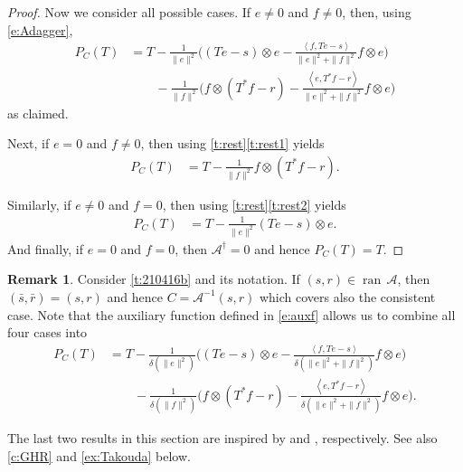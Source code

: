 \documentclass[12pt]{article}
\newcommand{\scal}[2]{\left\langle{#1},{#2}  \right\rangle}
\newcommand{\ran}{\ensuremath{{\operatorname{ran}}\,}}
\theoremstyle{definition}
\newtheorem{remark}[theorem]{Remark}
\providecommand{\ran}{\operatorname{ran}}
\providecommand{\ran}{\operatorname{ran}}
\providecommand{\mA}{\mathcal{A}}
\begin{document}
{\begin{proof}
Now we consider 
{ 
all possible
}
cases.
If $e\neq 0$ and $f\neq 0$, then,
using \cref{e:Adagger}, 
\begin{align*}
P_C(T)
&= T-
\frac{1}{\|e\|^2}\Big( (Te-s) \otimes e - 
\frac{\scal{f}{{Te-s}}}{\|e\|^2+\|f\|^2} f\otimes e\Big) \\
&\qquad - 
\frac{1}{\|f\|^2}\Big( f \otimes (T^*f-r)
-  \frac{\scal{e}{T^*f-r}}{\|e\|^2+\|f\|^2} f\otimes e\Big) 
\end{align*}
as claimed. 

Next, 
if $e=0$ and $f\neq 0$, then using
\cref{t:rest}\cref{t:rest1} yields
\begin{align*}
P_C(T)
&= T- \frac{1}{\|f\|^2} f \otimes (T^*f-r). 
\end{align*}

Similarly, 
if $e\neq 0$ and $f= 0$, then using
\cref{t:rest}\cref{t:rest2} yields
\begin{align*}
P_C(T)
&= T- \frac{1}{\|e\|^2} (Te-s) \otimes e. 
\end{align*}
And finally, if $e=0$ and $f=0$, then 
$\mA^\dagger =0$ and hence  
$P_C(T) = T$.
\end{proof}

\begin{remark}
Consider \cref{t:210416b} and its notation.
{ 
If $(s,r)\in\ran\mA$, 
then 
$(\bar{s},\bar{r})=(s,r)$ and 
hence $C = \mA^{-1}(s,r)$ which covers
also the consistent case.
Note that 
}
the auxiliary function defined in \cref{e:auxf}
allows us to combine all four cases into 
\begin{subequations}
\label{e:P_Call4}
\begin{align}
P_C(T) &= 
T  - \frac{1}{\delta(\|e\|^2)}
\Big( 
(Te-s)\otimes e
-\frac{\scal{f}{Te-s}}{\delta(\|e\|^2 + \|f\|^2)}f\otimes e
\Big)\\
&\qquad
- \frac{1}{\delta(\|f\|^2)}
\Big( 
f\otimes (T^*f-r)
-\frac{\scal{e}{T^*f-r}}{\delta(\|e\|^2 + \|f\|^2)}
f\otimes e  \Big).
\end{align}
\end{subequations}
\end{remark}

The last two results in this section 
are inspired by \cite[Theorem~2.1]{Gluntetal1}
and \cite[Theorem on page~566]{Khoury}, respectively.
See also \cref{c:GHR} and \cref{ex:Takouda} below. 

}
\end{document}
